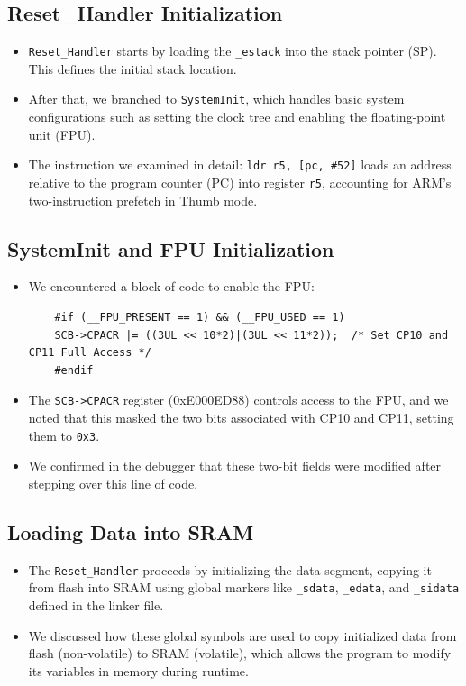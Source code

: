 \documentclass{article}
\begin{document}
\subsection{Reset\_Handler Initialization}
\begin{itemize}
    \item \texttt{Reset\_Handler} starts by loading the \texttt{\_estack} into the stack pointer (SP). This defines the initial stack location.
    \item After that, we branched to \texttt{SystemInit}, which handles basic system configurations such as setting the clock tree and enabling the floating-point unit (FPU).
    \item The instruction we examined in detail: \texttt{ldr r5, [pc, \#52]} loads an address relative to the program counter (PC) into register \texttt{r5}, accounting for ARM's two-instruction prefetch in Thumb mode.
\end{itemize}

\subsection{SystemInit and FPU Initialization}
\begin{itemize}
    \item We encountered a block of code to enable the FPU:
    \begin{lstlisting}
    #if (__FPU_PRESENT == 1) && (__FPU_USED == 1)
    SCB->CPACR |= ((3UL << 10*2)|(3UL << 11*2));  /* Set CP10 and CP11 Full Access */
    #endif
    \end{lstlisting}
    \item The \texttt{SCB->CPACR} register (0xE000ED88) controls access to the FPU, and we noted that this masked the two bits associated with CP10 and CP11, setting them to \texttt{0x3}.
    \item We confirmed in the debugger that these two-bit fields were modified after stepping over this line of code.
\end{itemize}

\subsection{Loading Data into SRAM}
\begin{itemize}
    \item The \texttt{Reset\_Handler} proceeds by initializing the data segment, copying it from flash into SRAM using global markers like \texttt{\_sdata}, \texttt{\_edata}, and \texttt{\_sidata} defined in the linker file.
    \item We discussed how these global symbols are used to copy initialized data from flash (non-volatile) to SRAM (volatile), which allows the program to modify its variables in memory during runtime.
\end{itemize}
\end{document}
